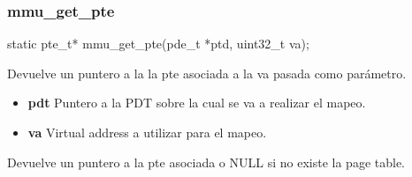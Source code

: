 \subsubsection{mmu\_get\_pte}
\begin{verbatimtab}
 static pte_t* mmu_get_pte(pde_t *ptd, uint32_t va);
\end{verbatimtab}
Devuelve un puntero a la la pte asociada a la va pasada como parámetro.\\
\begin{itemize}
  \item \textbf{pdt} Puntero a la PDT sobre la cual se va a realizar el mapeo.
  \item \textbf{va} Virtual address a utilizar para el mapeo.
\end{itemize}
Devuelve un puntero a la pte asociada o NULL si no existe la page table.
